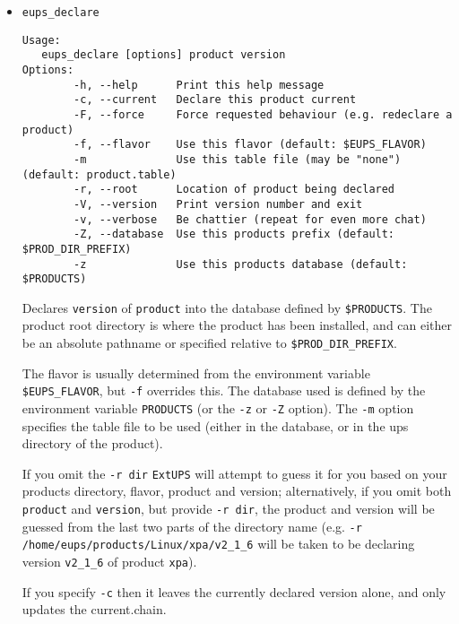 \documentclass{article}
\newcommand{\code}[1]{\texttt{#1}}
\newcommand{\eups}{\code{ExtUPS}}
\begin{document}
\begin{itemize}


\item \texttt{eups\_declare}
\begin{verbatim}
Usage:
   eups_declare [options] product version
Options:
        -h, --help      Print this help message
        -c, --current   Declare this product current
        -F, --force     Force requested behaviour (e.g. redeclare a product)
        -f, --flavor    Use this flavor (default: $EUPS_FLAVOR)
        -m              Use this table file (may be "none") (default: product.table)
        -r, --root      Location of product being declared
        -V, --version   Print version number and exit
        -v, --verbose   Be chattier (repeat for even more chat)
        -Z, --database  Use this products prefix (default: $PROD_DIR_PREFIX)
        -z              Use this products database (default: $PRODUCTS)
\end{verbatim}

Declares \texttt{version} of \texttt{product} into the database defined by \texttt{\$PRODUCTS}.
The product root directory is where the product has been installed, and can either
be an absolute pathname or specified relative to \texttt{\$PROD\_DIR\_PREFIX}.

The flavor is usually determined from the
environment variable \texttt{\$EUPS\_FLAVOR}, but \texttt{-f}
overrides this. The database used is defined by the environment
variable \texttt{PRODUCTS} (or the \texttt{-z} or \texttt{-Z} option).
The \texttt{-m} option specifies the table
file to be used (either in the database, or in the ups directory of the product).

If you omit the \texttt{-r dir} \eups{} will attempt to guess it for you based
on your products directory, flavor, product and version; alternatively,
if you omit both \texttt{product} and \texttt{version}, but provide \texttt{-r dir},
the product and version will be guessed from the last two parts of the directory
name (e.g. \texttt{-r /home/eups/products/Linux/xpa/v2\_1\_6} will be taken to be
declaring version \texttt{v2\_1\_6} of product \texttt{xpa}).

If you specify \texttt{-c} then it leaves the currently declared version alone, and
only updates the current.chain.



\end{itemize}
\end{document}
